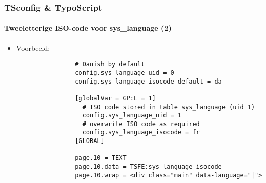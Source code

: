 \begin{frame}[fragile]
	\frametitle{TSconfig \& TypoScript}
	\framesubtitle{Tweeletterige ISO-code voor sys\_language (2)}

	\begin{itemize}
		\item Voorbeeld:

			\begin{lstlisting}
				# Danish by default
				config.sys_language_uid = 0
				config.sys_language_isocode_default = da

				[globalVar = GP:L = 1]
				  # ISO code stored in table sys_language (uid 1)
				  config.sys_language_uid = 1
				  # overwrite ISO code as required
				  config.sys_language_isocode = fr
				[GLOBAL]

				page.10 = TEXT
				page.10.data = TSFE:sys_language_isocode
				page.10.wrap = <div class="main" data-language="|">
			\end{lstlisting}

	\end{itemize}

\end{frame}


